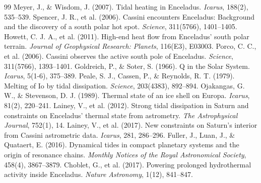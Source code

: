 \documentclass[11pt,a4paper]{article}
\begin{document}
\begin{thebibliography}{99}
 Meyer, J., \& Wisdom, J. (2007). Tidal heating in Enceladus. \textit{Icarus}, 188(2), 535--539.
 Spencer, J. R., et al. (2006). Cassini encounters Enceladus: Background and the discovery of a south polar hot spot. \textit{Science}, 311(5766), 1401--1405.
 Howett, C. J. A., et al. (2011). High-end heat flow from Enceladus' south polar terrain. \textit{Journal of Geophysical Research: Planets}, 116(E3), E03003.
 Porco, C. C., et al. (2006). Cassini observes the active south pole of Enceladus. \textit{Science}, 311(5766), 1393--1401.
 Goldreich, P., \& Soter, S. (1966). Q in the Solar System. \textit{Icarus}, 5(1-6), 375--389.
 Peale, S. J., Cassen, P., \& Reynolds, R. T. (1979). Melting of Io by tidal dissipation. \textit{Science}, 203(4383), 892--894.
 Ojakangas, G. W., \& Stevenson, D. J. (1989). Thermal state of an ice shell on Europa. \textit{Icarus}, 81(2), 220--241.
 Lainey, V., et al. (2012). Strong tidal dissipation in Saturn and constraints on Enceladus' thermal state from astrometry. \textit{The Astrophysical Journal}, 752(1), 14.
 Lainey, V., et al. (2017). New constraints on Saturn's interior from Cassini astrometric data. \textit{Icarus}, 281, 286--296.
 Fuller, J., Luan, J., \& Quataert, E. (2016). Dynamical tides in compact planetary systems and the origin of resonance chains. \textit{Monthly Notices of the Royal Astronomical Society}, 458(4), 3867--3879.
 Choblet, G., et al. (2017). Powering prolonged hydrothermal activity inside Enceladus. \textit{Nature Astronomy}, 1(12), 841--847.
\end{thebibliography}
\end{document}
